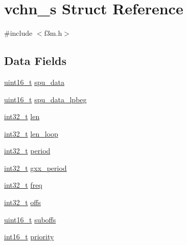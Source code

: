\hypertarget{structvchn__s}{}\section{vchn\+\_\+s Struct Reference}
\label{structvchn__s}


{\ttfamily \#include $<$f3m.\+h$>$}

\subsection*{Data Fields}
\begin{DoxyCompactItemize}
\item 
\hyperlink{inttypes_8h_a273cf69d639a59973b6019625df33e30}{uint16\+\_\+t} \hyperlink{structvchn__s_aa040a2d8245cf4727ee3b00f4bcff1d2}{spu\+\_\+data}
\item 
\hyperlink{inttypes_8h_a273cf69d639a59973b6019625df33e30}{uint16\+\_\+t} \hyperlink{structvchn__s_a34db93418f7b611c77e26b7529de695e}{spu\+\_\+data\+\_\+lpbeg}
\item 
\hyperlink{inttypes_8h_a32f2e37ee053cf2ce8ca28d1f74630e5}{int32\+\_\+t} \hyperlink{structvchn__s_a7c2d713330f7467f807c18d33a8879ec}{len}
\item 
\hyperlink{inttypes_8h_a32f2e37ee053cf2ce8ca28d1f74630e5}{int32\+\_\+t} \hyperlink{structvchn__s_ade9560c5eff8b25a29619b9754535ec5}{len\+\_\+loop}
\item 
\hyperlink{inttypes_8h_a32f2e37ee053cf2ce8ca28d1f74630e5}{int32\+\_\+t} \hyperlink{structvchn__s_a5355bdecb9e3c274f2af80bc63595707}{period}
\item 
\hyperlink{inttypes_8h_a32f2e37ee053cf2ce8ca28d1f74630e5}{int32\+\_\+t} \hyperlink{structvchn__s_a8bf00d8328bdad4d40686a4292d02044}{gxx\+\_\+period}
\item 
\hyperlink{inttypes_8h_a32f2e37ee053cf2ce8ca28d1f74630e5}{int32\+\_\+t} \hyperlink{structvchn__s_ad855168d23dca520770e6b4bf66a1e11}{freq}
\item 
\hyperlink{inttypes_8h_a32f2e37ee053cf2ce8ca28d1f74630e5}{int32\+\_\+t} \hyperlink{structvchn__s_a9c50870cc1b47101bec61ce62812c1f4}{offs}
\item 
\hyperlink{inttypes_8h_a273cf69d639a59973b6019625df33e30}{uint16\+\_\+t} \hyperlink{structvchn__s_a1b02ef0b17eb67e13720ba05c670da05}{suboffs}
\item 
\hyperlink{inttypes_8h_aa343fa3b3d06292b959ffdd4c4703b06}{int16\+\_\+t} \hyperlink{structvchn__s_aa6a6d8155bbf8ac276e08de93ccbc7e1}{priority}
\item 

\end{DoxyCompactItemize}
